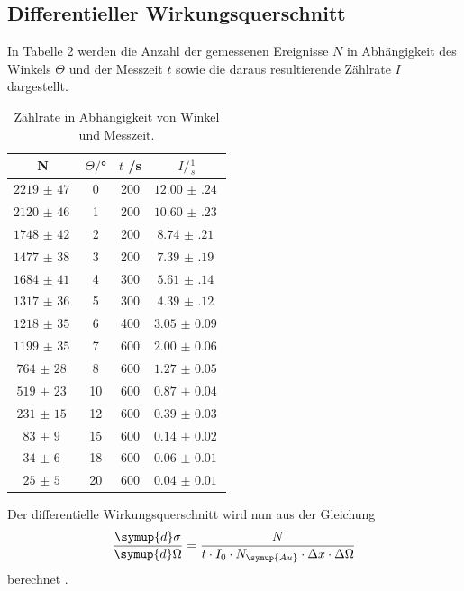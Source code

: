 \subsection{Differentieller Wirkungsquerschnitt}
\label{sec:wq}
In Tabelle 2 werden die Anzahl der gemessenen Ereignisse $N$ in Abhängigkeit des Winkels $\Theta$ und der Messzeit $t$
sowie die daraus resultierende Zählrate $I$ dargestellt.


\begin{table}[H]
  \centering
  \caption{Zählrate in Abhängigkeit von Winkel und Messzeit.}
  \label{tab:Parameter}
  \begin{tabular}{c c c c}
    \toprule
    N & $\Theta/$° & $t$ /s & $I / \frac{1}{s}$\\
    \midrule
    $\SI{2219(47)}{}$ &  0 & 200 & $\SI{12.00(24)}{}$ \\
    $\SI{2120(46)}{}$ &  1 & 200 & $\SI{10.60(23)}{}$ \\
    $\SI{1748(42)}{}$ &  2 & 200 & $\SI{8.74(21)}{}$ \\
    $\SI{1477(38)}{}$ &  3 & 200 & $\SI{7.39(19)}{}$ \\
    $\SI{1684(41)}{}$ &  4 & 300 & $\SI{5.61(14)}{}$ \\
    $\SI{1317(36)}{}$ &  5 & 300 & $\SI{4.39(12)}{}$ \\
    $\SI{1218(35)}{}$ &  6 & 400 & $\SI{3.05(9)}{}$ \\
    $\SI{1199(35)}{}$ &  7 & 600 & $\SI{2.00(6)}{}$ \\
    $\SI{764(28)}{}$  &  8 & 600 & $\SI{1.27(5)}{}$ \\
    $\SI{519(23)}{}$  & 10 & 600 & $\SI{0.87(4)}{}$ \\
    $\SI{231(15)}{}$  & 12 & 600 & $\SI{0.39(3)}{}$ \\
    $\SI{83(9)}{}$    & 15 & 600 & $\SI{0.14(2)}{}$ \\
    $\SI{34(6)}{}$    & 18 & 600 & $\SI{0.06(1)}{}$ \\
    $\SI{25(5)}{}$    & 20 & 600 & $\SI{0.04(1)}{}$ \\
    \bottomrule
  \end{tabular}
\end{table}

Der differentielle Wirkungsquerschnitt wird nun aus der Gleichung
\begin{equation}
  \frac{\symup{d}\sigma}{\symup{d}\Omega} = \frac{N}{t \cdot I_0 \cdot N_\symup{Au} \cdot \Delta x \cdot \Delta \Omega}
  \label{eqn:wq}
\end{equation}
berechnet \cite{sample10} \cite{sample9}.

